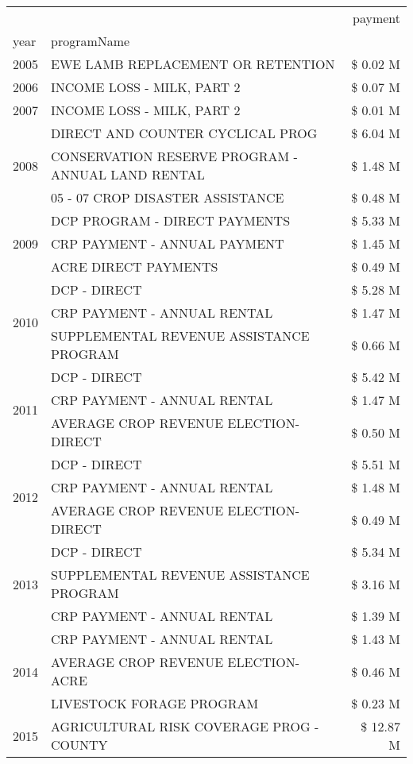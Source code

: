 \begin{tabular}{llr}
\toprule
 &  & payment \\
year & programName &  \\
\midrule
2005 & EWE LAMB REPLACEMENT OR RETENTION & \$ 0.02 M \\
\cline{1-3}
2006 & INCOME LOSS - MILK, PART 2 & \$ 0.07 M \\
\cline{1-3}
2007 & INCOME LOSS - MILK, PART 2 & \$ 0.01 M \\
\cline{1-3}
\multirow[t]{3}{*}{2008} & DIRECT AND COUNTER CYCLICAL PROG & \$ 6.04 M \\
 & CONSERVATION RESERVE PROGRAM - ANNUAL LAND RENTAL & \$ 1.48 M \\
 & 05 - 07 CROP DISASTER ASSISTANCE & \$ 0.48 M \\
\cline{1-3}
\multirow[t]{3}{*}{2009} & DCP PROGRAM - DIRECT PAYMENTS & \$ 5.33 M \\
 & CRP PAYMENT - ANNUAL PAYMENT & \$ 1.45 M \\
 & ACRE DIRECT PAYMENTS & \$ 0.49 M \\
\cline{1-3}
\multirow[t]{3}{*}{2010} & DCP - DIRECT & \$ 5.28 M \\
 & CRP PAYMENT - ANNUAL RENTAL & \$ 1.47 M \\
 & SUPPLEMENTAL REVENUE ASSISTANCE PROGRAM & \$ 0.66 M \\
\cline{1-3}
\multirow[t]{3}{*}{2011} & DCP - DIRECT & \$ 5.42 M \\
 & CRP PAYMENT - ANNUAL RENTAL & \$ 1.47 M \\
 & AVERAGE CROP REVENUE ELECTION-DIRECT & \$ 0.50 M \\
\cline{1-3}
\multirow[t]{3}{*}{2012} & DCP - DIRECT & \$ 5.51 M \\
 & CRP PAYMENT - ANNUAL RENTAL & \$ 1.48 M \\
 & AVERAGE CROP REVENUE ELECTION-DIRECT & \$ 0.49 M \\
\cline{1-3}
\multirow[t]{3}{*}{2013} & DCP - DIRECT & \$ 5.34 M \\
 & SUPPLEMENTAL REVENUE ASSISTANCE PROGRAM & \$ 3.16 M \\
 & CRP PAYMENT - ANNUAL RENTAL & \$ 1.39 M \\
\cline{1-3}
\multirow[t]{3}{*}{2014} & CRP PAYMENT - ANNUAL RENTAL & \$ 1.43 M \\
 & AVERAGE CROP REVENUE ELECTION-ACRE & \$ 0.46 M \\
 & LIVESTOCK FORAGE PROGRAM & \$ 0.23 M \\
\cline{1-3}
\multirow[t]{3}{*}{2015} & AGRICULTURAL RISK COVERAGE PROG - COUNTY & \$ 12.87 M \\

\end{tabular}
